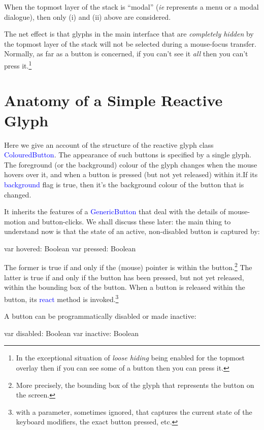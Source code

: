 \documentclass[12pt,a4paper]{article}
\def\Scala#1{\textcolor{blue}{\textsf{#1}}}
\def\S#1{\section{#1}}
\begin{document}
When the topmost layer of the stack is ``modal'' (\textit{ie} represents a menu
or a modal dialogue), then only (i) and (ii) above are considered.

The net effect is that glyphs in the main interface
that are \textit{completely hidden} by the topmost layer of the stack will not
be selected during a mouse-focus transfer. Normally, as far as a button
is concerned, if you can't see it \textit{all} then you can't press
it.\footnote{In the exceptional situation of \textit{loose hiding} being
enabled for the topmost overlay then if you can see some of a button then you can press it.}

\clearpage
\S{Anatomy of a Simple Reactive Glyph}\label{anatomy}

Here we give an account of the structure of the reactive glyph class
\Scala{ColouredButton}. The appearance of such buttons is specified
by a single glyph. The  foreground (or the background) colour of the glyph
changes when the mouse hovers over it, and when a button is
pressed (but not yet released) within it.If its \Scala{background}
flag is true, then it's the background colour of the button that is changed.

It inherits the features of a \Scala{GenericButton} that deal with
the details of mouse-motion and button-clicks. We shall discuss
these later: the main thing to understand now is that the state of
an active, non-disabled button is captured by:

\begin{scala}
    var hovered:  Boolean
    var pressed:  Boolean
\end{scala}

The former is true if and only if the (mouse) pointer is within the
button.\footnote{More precisely, the bounding
box of the glyph that represents the button on the screen.} The
latter is true if and only if the button has been pressed, but not
yet released, within the bounding box of the button. When a button is
released within the button, its \Scala{react} method is
invoked.\footnote{with a parameter, sometimes ignored, that captures the
current state of the keyboard modifiers, the exact button pressed, etc.}

A button can be programmatically disabled or made inactive:
\begin{scala}
    var disabled: Boolean
    var inactive: Boolean
\end{scala}
\end{document}
